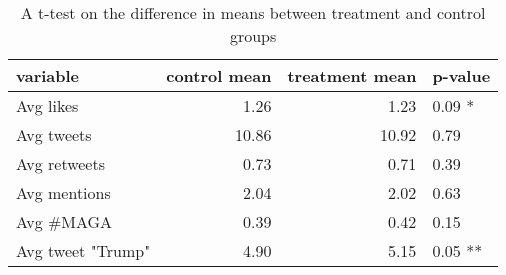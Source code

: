 \begin{table}[ht]
\centering
\begin{tabular}{lrrl}
  \hline
variable & control mean & treatment mean & p-value \\ 
  \hline
Avg likes & 1.26 & 1.23 & 0.09 * \\ 
  Avg tweets & 10.86 & 10.92 & 0.79 \\ 
  Avg retweets & 0.73 & 0.71 & 0.39 \\ 
  Avg mentions & 2.04 & 2.02 & 0.63 \\ 
  Avg \#MAGA & 0.39 & 0.42 & 0.15 \\ 
  Avg tweet "Trump" & 4.90 & 5.15 & 0.05 ** \\ 
   \hline
\end{tabular}
\caption{A t-test on the difference in means between treatment and control groups} 
\label{table:diff_means}
\end{table}
